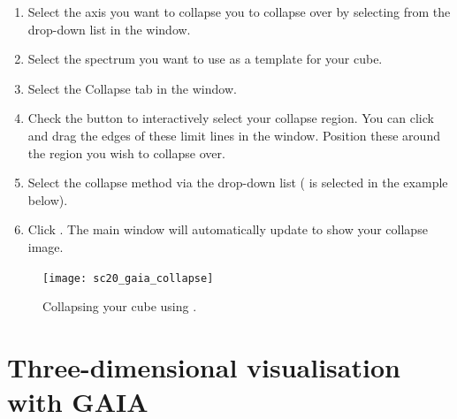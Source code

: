 \documentclass[11pt,oneside,chapters]{starlink}
\begin{document}
\begin{enumerate}[label=(\textbf{\arabic*})]

\item Select the axis you want to collapse you to collapse over by
selecting from the  drop-down list in the
 window.

\item Select the spectrum you want to use as a template for your cube.

\item Select the Collapse tab in the  window.

\item Check the  button to
interactively select your collapse region.  You can click and drag the
edges of these limit lines in the  window.
Position these around the region you wish to collapse over.

\item Select the collapse method via the  drop-down list ( is selected in the example below).

\item Click . The main window will automatically update
to show your collapse image.
\end{enumerate}

\begin{figure}[h!]
\begin{center}
\texttt{[image: sc20\_gaia\_collapse]}
\caption[Collapsing your cube using \gaia.]{\label{fig:gaia_collapse}
  Collapsing your cube using \gaia.}
\end{center}
\end{figure}

\section{Three-dimensional visualisation with GAIA}
\end{document}
